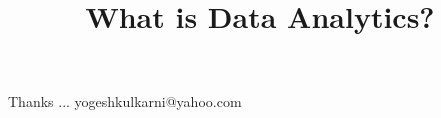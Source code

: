 \documentclass[xcolor=dvipsnames,compress,t,pdf,9pt]{beamer}
\title[\insertframenumber /\inserttotalframenumber]{What is Data Analytics?}
\begin{document}
	\begin{frame}
	\titlepage
	\end{frame}

	
	
	\begin{frame}[c]{}
	Thanks ...
	\vspace{5mm}
	yogeshkulkarni@yahoo.com
	\end{frame}
\end{document}
